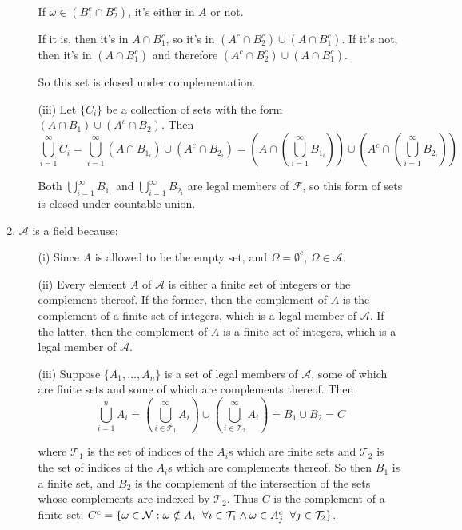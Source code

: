 \documentclass[12pt]{article}
\begin{document}
\begin{enumerate}
\begin{itemize}
If $\omega \in (B_1^c \cap B_2^c)$, it's either in $A$ or not. 

If it is, then it's in $A\cap B_1^c$, so it's in $(A^c \cap B_2^c) \cup (A \cap B_1^c)$. If it's not, then it's in $(A \cap B_1^c)$ and therefore $(A^c \cap B_2^c) \cup (A \cap B_1^c)$.

So this set is closed under complementation.
 
\item[(iii)] Let $\{C_i\}$ be a collection of sets with the form $(A \cap B_1)\cup(A^c \cap B_2)$. Then $$\bigcup^\infty_{i=1}C_i=\bigcup^\infty_{i=1}(A \cap B_{1_i})\cup(A^c \cap B_{2_i})= \left( A \cap \left(\bigcup^\infty_{i=1} B_{1_i} \right) \right)\cup \left( A^c \cap \left(\bigcup^\infty_{i=1} B_{2_i} \right) \right)$$

Both $\bigcup^\infty_{i=1} B_{1_i}$ and $\bigcup^\infty_{i=1} B_{2_i}$ are legal members of $\mathcal{F}$, so this form of sets is closed under countable union.

\end{itemize}

\item $\mathcal{A}$ is a field because:

\begin{itemize}
\item[(i)] Since $A$ is allowed to be the empty set, and $\Omega = \emptyset^c$, $\Omega \in \mathcal{A}$.
\item[(ii)] Every element $A$ of $\mathcal{A}$ is either a finite set of integers or the complement thereof. If the former, then the complement of $A$ is the complement of a finite set of integers, which is a legal member of $\mathcal{A}$. If the latter, then the complement of $A$ is a finite set of integers, which is a legal member of $\mathcal{A}$.
\item[(iii)] Suppose $\{A_1,\dots, A_n \}$ is a set of legal members of $\mathcal{A}$, some of which are finite sets and some of which are complements thereof. Then $$\bigcup^n_{i=1} A_i= \left(\bigcup^\infty_{i \in \mathcal{T}_1} A_i \right) \cup \left(\bigcup^\infty_{i \in \mathcal{T}_2} A_i \right)=B_1 \cup B_2 = C$$ 

where $\mathcal{T}_1$ is the set of indices of the $A_i$s which are finite sets and $\mathcal{T}_2$ is the set of indices of the $A_i$s which are complements thereof. So then $B_1$ is a finite set, and 
$B_2$ is the complement of the intersection of the sets whose complements are indexed by $\mathcal{T}_2$. Thus $C$ is the complement of a finite set; $C^c=\{\omega \in \mathcal{N}: \omega \notin A_i \hspace{2mm} \forall i\in \mathcal{T}_1 \land \omega \in A_j^c \hspace{2mm} \forall j\in \mathcal{T}_2\}$.
\end{itemize}


\end{enumerate}
\end{document}
